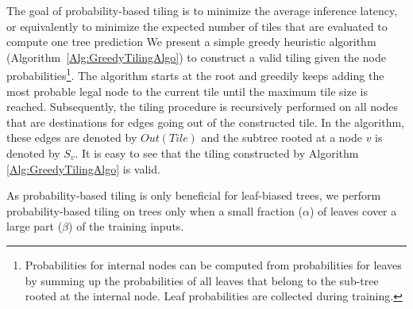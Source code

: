 The goal of probability-based tiling is to minimize the average inference latency, or equivalently to minimize the expected
number of tiles that are evaluated to compute one tree prediction
We present a simple greedy heuristic algorithm (Algorithm~\ref{Alg:GreedyTilingAlgo}) to construct a valid tiling given
the node probabilities\footnote{Probabilities for internal nodes can be computed from probabilities for leaves by summing
up the probabilities of all leaves that belong to the sub-tree rooted at the internal node. Leaf probabilities are collected
during training.}. The algorithm starts at the root and greedily keeps adding the most probable legal node to the current
tile until the maximum tile size is reached. Subsequently, the tiling procedure is recursively performed on all nodes 
that are destinations for edges going out of the constructed tile. 
In the algorithm, these edges are denoted by $Out(Tile)$ and the subtree rooted at a node $v$ is denoted by $S_v$.
It is easy to see that the tiling constructed by Algorithm \ref{Alg:GreedyTilingAlgo} is valid.



As  probability-based tiling is only beneficial for leaf-biased trees,
we  perform probability-based tiling on trees only when a small fraction ($\alpha$) of leaves cover a large part ($\beta$) of the training inputs.
